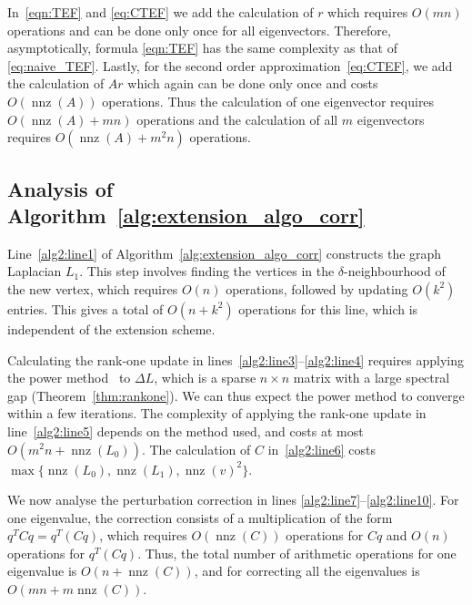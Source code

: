 \documentclass[11pt]{article}
\begin{document}
In~\eqref{eqn:TEF} and \eqref{eq:CTEF} we add the calculation of $r$ which requires $O(mn)$ operations and can be done only once for all eigenvectors. Therefore, asymptotically, formula \eqref{eqn:TEF} has the same complexity as that of \eqref{eq:naive_TEF}. Lastly, for the second order approximation~\eqref{eq:CTEF}, we add the calculation of $Ar$ which again can be done only once and costs $O(\operatorname{nnz}(A))$ operations.  Thus the calculation of one eigenvector requires $O(\operatorname{nnz}(A) + mn)$ operations and the calculation of all $m$ eigenvectors requires $ O(\operatorname{nnz}(A) + m^2n)$ operations.

\subsection{Analysis of Algorithm~\ref{alg:extension_algo_corr}} \label{sec:comp_lag}

Line~\ref{alg2:line1} of Algorithm~\ref{alg:extension_algo_corr} constructs the graph Laplacian $L_1$. This step involves finding the vertices in the $\delta$-neighbourhood of the new vertex, which requires $O(n)$ operations, followed by updating $O(k^2)$ entries. This gives a total of $O(n + k^2)$ operations for this line, which is independent of the extension scheme.  

Calculating the rank-one update in lines~\ref{alg2:line3}--\ref{alg2:line4} requires applying the power method~\cite[Chapter 8]{golub2012matrix} to $\Delta L$, which is a sparse $n \times n$ matrix with a large spectral gap (Theorem~\ref{thm:rankone}). We can thus expect the power method to converge within a few iterations.
The complexity of applying the rank-one update in line~\ref{alg2:line5} depends on the method used, and costs at most $O(m^2n + \operatorname{nnz}(L_0))$. The calculation of $C$ in~\ref{alg2:line6} costs $\operatorname{max}\big\{\operatorname{nnz}(L_0), \operatorname{nnz}(L_1), \operatorname{nnz}(v)^2\big\}$.

We now analyse the perturbation correction in lines \ref{alg2:line7}--\ref{alg2:line10}. For one eigenvalue, the correction consists of a multiplication  of the form $q^TCq = q^T(Cq)$, which requires $O(\operatorname{nnz}(C))$ operations for $Cq$ and $O(n)$ operations for $q^T(Cq)$. Thus, the total number of arithmetic operations for one eigenvalue is $O(n + \operatorname{nnz}(C))$, and for correcting all the eigenvalues is $O(mn + m\operatorname{nnz}(C))$.
\end{document}
